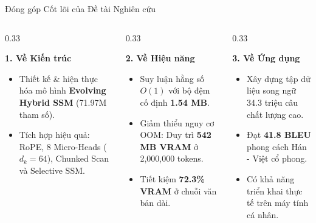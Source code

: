 \documentclass[aspectratio=169, 10pt]{beamer}
\begin{document}
\begin{frame}{Đóng góp Cốt lõi của Đề tài Nghiên cứu}
  \begin{columns}[t]
    \begin{column}{0.33\textwidth}
      \begin{block}{\textbf{1. Về Kiến trúc}}
        \begin{itemize}
          \item Thiết kế \& hiện thực hóa mô hình \textbf{Evolving Hybrid SSM} (71.97M tham số).
          \item Tích hợp hiệu quả: RoPE, 8 Micro-Heads ($d_k=64$), Chunked Scan và Selective SSM.
        \end{itemize}
      \end{block}
    \end{column}
    \begin{column}{0.33\textwidth}
      \begin{block}{\textbf{2. Về Hiệu năng}}
        \begin{itemize}
          \item Suy luận hằng số $O(1)$ với bộ đệm cố định \textbf{1.54 MB}.
          \item Giảm thiểu nguy cơ OOM: Duy trì \textbf{542 MB VRAM} ở 2,000,000 tokens.
          \item Tiết kiệm \textbf{72.3\% VRAM} ở chuỗi văn bản dài.
        \end{itemize}
      \end{block}
    \end{column}
    \begin{column}{0.33\textwidth}
      \begin{block}{\textbf{3. Về Ứng dụng}}
        \begin{itemize}
          \item Xây dựng tập dữ liệu song ngữ 34.3 triệu câu chất lượng cao.
          \item Đạt \textbf{41.8 BLEU} phong cách Hán - Việt cổ phong.
          \item Có khả năng triển khai thực tế trên máy tính cá nhân.
        \end{itemize}
      \end{block}
    \end{column}
  \end{columns}
\end{frame}
\end{document}

